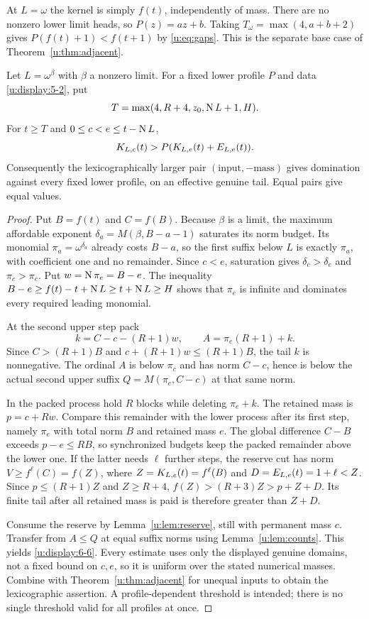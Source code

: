 At $L=\omega$ the kernel is simply $f(t)$, independently of mass. There
are no nonzero lower limit heads, so $P(z)=az+b$. Taking
$T_\omega=\max(4,a+b+2)$ gives
$P(f(t)+1)<f(t+1)$ by \eqref{u:eq:gaps}. This is the separate base case of
Theorem~\ref{u:thm:adjacent}.

\begin{theorem}\label{u:thm:limitmass}
Let $L=\omega^\beta$ with $\beta$ a nonzero limit. For a fixed lower
profile $P$ and data \eqref{u:display:5-2}, put
\begin{equation}
           T=\max(4,R+4,z_0,\operatorname{N} L+1,H).            \label{u:display:6-5}
\end{equation}
For $t\ge T$ and $0\le c<e\le t-\operatorname{N} L$,
\begin{equation}
                K_{L,c}(t)>P(K_{L,e}(t)+E_{L,e}(t)).    \label{u:display:6-6}
\end{equation}
Consequently the lexicographically larger pair $(\text{input},-\text{mass})$
gives domination against every fixed lower profile, on an effective
genuine tail. Equal pairs give equal values.
\end{theorem}
\begin{proof}
Put $B=f(t)$ and $C=f(B)$. Because $\beta$ is a limit, the maximum
affordable exponent $\delta_a=M(\beta,B-a-1)$ saturates its norm budget.
Its monomial $\pi_a=\omega^{\delta_a}$ already costs $B-a$, so the first
suffix below $L$ is exactly $\pi_a$, with coefficient one and no remainder.
Since $c<e$, saturation gives $\delta_c>\delta_e$ and $\pi_c>\pi_e$.
Put $w=\operatorname{N}\pi_e=B-e$. The inequality
$B-e\ge f(t)-t+\operatorname{N} L\ge t+\operatorname{N} L\ge H$ shows that $\pi_e$ is
infinite and dominates every required leading monomial.

At the second upper step pack
\[
       k=C-c-(R+1)w,\qquad A=\pi_e(R+1)+k.
\]
Since $C>(R+1)B$ and $c+(R+1)w\le(R+1)B$, the tail $k$ is nonnegative.
The ordinal $A$ is below $\pi_c$ and has norm $C-c$, hence is below the
actual second upper suffix $Q=M(\pi_c,C-c)$ at that same norm.

In the packed process hold $R$ blocks while deleting $\pi_e+k$.
The retained mass is $p=c+Rw$. Compare this remainder with the lower
process after its first step, namely $\pi_e$ with total norm $B$ and
retained mass $e$. The global difference $C-B$ exceeds $p-e\le RB$,
so synchronized budgets keep the packed remainder above the lower one.
If the latter needs $\ell$ further steps, the reserve cut has norm
$V\ge f^\ell(C)=f(Z)$, where $Z=K_{L,e}(t)=f^\ell(B)$ and
$D=E_{L,e}(t)=1+\ell<Z$. Since $p\le(R+1)Z$ and $Z\ge R+4$,
$f(Z)>(R+3)Z>p+Z+D$. Its finite tail after all retained mass is paid
is therefore greater than $Z+D$.

Consume the reserve by Lemma~\ref{u:lem:reserve}, still with permanent mass
$c$. Transfer from $A\le Q$ at equal suffix norms using
Lemma~\ref{u:lem:counts}. This yields \eqref{u:display:6-6}. Every estimate uses only the
displayed genuine domains, not a fixed bound on $c,e$, so it is uniform
over the stated numerical masses. Combine with
Theorem~\ref{u:thm:adjacent} for unequal inputs to obtain the lexicographic
assertion. A profile-dependent threshold is intended; there is no single
threshold valid for all profiles at once.
\end{proof}
